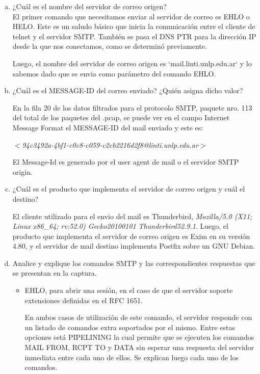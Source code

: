 \documentclass[osajnl,twocolumn,showpacs,superscriptaddress,10pt]{revtex4-1} %
\begin{document}
\begin{enumerate}[a)]
  \item ¿Cuál es el nombre del servidor de correo origen? \\

  El primer comando que necesitamos enviar al servidor de correo es EHLO o HELO. Este es un saludo básico que inicia la comunicación entre el cliente de telnet y el servidor SMTP. También se pasa el DNS PTR para la dirección IP desde la que nos conectamos, como se determinó previamente.

  Luego, el nombre del servidor de correo origen es `mail.linti.unlp.edu.ar` y lo sabemos dado que se envia como parámetro del comando EHLO. \\

  \item ¿Cuál es el MESSAGE-ID del correo enviado? ¿Quién asigna dicho valor?

  En la fila 20 de los datos filtrados para el protocolo SMTP, paquete nro. 113 del total de los paquetes del .pcap, se puede ver en el campo Internet Message Format el MESSAGE-ID del mail enviado y este es:
  
  \textit{$<$94c3492a-4bf1-c0c8-c059-c2cb2216d2f8@linti.unlp.edu.ar$>$}
  
  El Message-Id es generado por el user agent de mail o el servidor SMTP origin. \\
  
  \item ¿Cuál es el producto que implementa el servidor de correo origen y cuál el destino?
  
  El cliente utilizado para el envio del mail es Thunderbird, \textit{Mozilla/5.0 (X11; Linux x86\_64; rv:52.0) Gecko\/20100101 Thunderbird\/52.9.1}. Luego, el producto que implementa el servidor de correo origen es Exim en su versión 4.80, y el servidor de mail destino implementa Postfix sobre un GNU Debian. \\
  
  \item Analice y explique los comandos SMTP y las correspondientes respuestas que se presentan en la captura.
  
  \begin{itemize}
    \item EHLO, para abrir una sesión, en el caso de que el servidor soporte extensiones definidas en el RFC 1651.
    
    En ambos casos de utilización de este comando, el servidor responde con un listado de comandos extra soportados por el mismo. Entre estas opciones está PIPELINING la cual permite que se ejecuten los comandos MAIL FROM, RCPT TO y DATA sin esperar una respuesta del servidor inmediata entre cada uno de ellos. Se explican luego cada uno de los comandos. \\
    

\end{itemize}
\end{enumerate}
\end{document}
